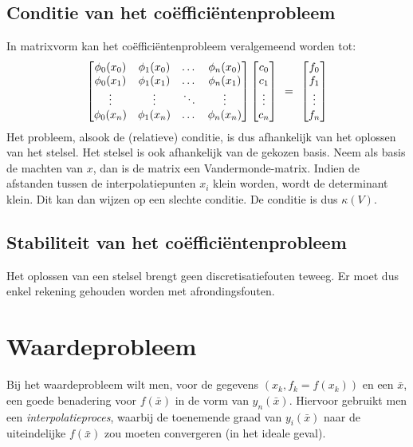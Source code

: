 \documentclass[11pt]{report}
\def \eq {\hspace{1.5mm}=\hspace{1.5mm}}
\begin{document}
\subsection{Conditie van het co\"{e}ffici\"{e}ntenprobleem}
	In matrixvorm kan het co\"{e}ffici\"{e}ntenprobleem veralgemeend worden tot:
	\begin{equation*}
		\begin{bmatrix}
			\phi_0(x_0) & \phi_1(x_0) & \dots & \phi_n(x_0)\\
			\phi_0(x_1) & \phi_1(x_1) & \dots & \phi_n(x_1)\\
			\vdots  & \vdots & \ddots & \vdots \\
			\phi_0(x_n) & \phi_1(x_n) & \dots & \phi_n(x_n)\\
		\end{bmatrix} 
		\begin{bmatrix}
			c_0 \\ c_1 \\ \vdots \\ c_n
		\end{bmatrix}
		\eq
		\begin{bmatrix}
			f_0 \\ f_1 \\ \vdots \\ f_n
		\end{bmatrix}
	\end{equation*}
	Het probleem, alsook de (relatieve) conditie, is dus afhankelijk van het oplossen van het stelsel. Het stelsel is ook afhankelijk van de gekozen basis. Neem als basis de machten van $x$, dan is de matrix een Vandermonde-matrix. Indien de afstanden tussen de interpolatiepunten $x_i$ klein worden, wordt de determinant klein. Dit kan dan wijzen op een slechte conditie. De conditie is dus $\kappa(V)$.

\subsection{Stabiliteit van het co\"{e}ffici\"{e}ntenprobleem}
	Het oplossen van een stelsel brengt geen discretisatiefouten teweeg. Er moet dus enkel rekening gehouden worden met afrondingsfouten.
	
\section{Waardeprobleem}
	Bij het waardeprobleem wilt men, voor de gegevens $(x_k, f_k = f(x_k))$ en een $\bar x$, een goede benadering voor $f(\bar x)$ in de vorm van $y_n(\bar x)$. Hiervoor gebruikt men een \textit{interpolatieproces}, waarbij de toenemende graad van $y_i(\bar x)$ naar de uiteindelijke $f(\bar x)$ zou moeten convergeren (in het ideale geval).
	
\end{document}
